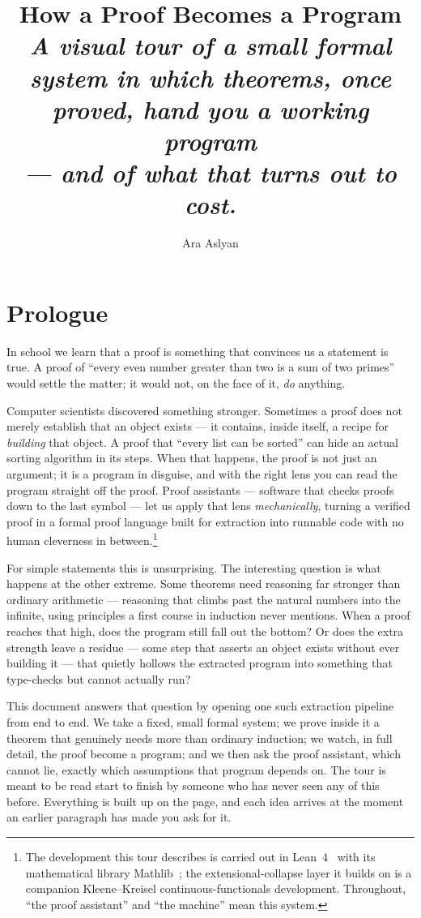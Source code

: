 \documentclass[11pt]{article}
\title{\bfseries How a Proof Becomes a Program\\[6pt]
  \normalfont\large\itshape A visual tour of a small formal system in which
  theorems, once proved, hand you a working program\\ --- and of what that
  turns out to cost.}
\author{Ara Aslyan}
\date{}
\begin{document}
\maketitle
\thispagestyle{empty}

\section*{Prologue}

In school we learn that a proof is something that convinces us a statement
is true. A proof of ``every even number greater than two is a sum of two
primes'' would settle the matter; it would not, on the face of it, \emph{do}
anything.

Computer scientists discovered something stronger. Sometimes a proof does
not merely establish that an object exists --- it contains, inside itself, a
recipe for \emph{building} that object. A proof that ``every list can be
sorted'' can hide an actual sorting algorithm in its steps. When that
happens, the proof is not just an argument; it is a program in disguise, and
with the right lens you can read the program straight off the proof. Proof
assistants --- software that checks proofs down to the last symbol --- let us
apply that lens \emph{mechanically}, turning a verified proof in a formal
proof language built for extraction into runnable code with no human
cleverness in between.\footnote{The development this tour
describes is carried out in Lean~4~\citep{demoura2021} with its mathematical
library Mathlib~\citep{mathlib2020}; the extensional-collapse layer it builds
on is a companion Kleene--Kreisel continuous-functionals development.
Throughout, ``the proof assistant'' and ``the machine'' mean this system.}

For simple statements this is unsurprising. The interesting question is what
happens at the other extreme. Some theorems need reasoning far stronger than
ordinary arithmetic --- reasoning that climbs past the natural numbers into
the infinite, using principles a first course in induction never mentions.
When a proof reaches that high, does the program still fall out the bottom?
Or does the extra strength leave a residue --- some step that asserts an
object exists without ever building it --- that quietly hollows the extracted
program into something that type-checks but cannot actually run?

This document answers that question by opening one such extraction pipeline
from end to end. We take a fixed, small formal system; we prove inside it a
theorem that genuinely needs more than ordinary induction; we watch, in full
detail, the proof become a program; and we then ask the proof assistant,
which cannot lie, exactly which assumptions that program depends on. The
tour is meant to be read start to finish by someone who has never seen any
of this before. Everything is built up on the page, and each idea arrives at
the moment an earlier paragraph has made you ask for it.
\end{document}
